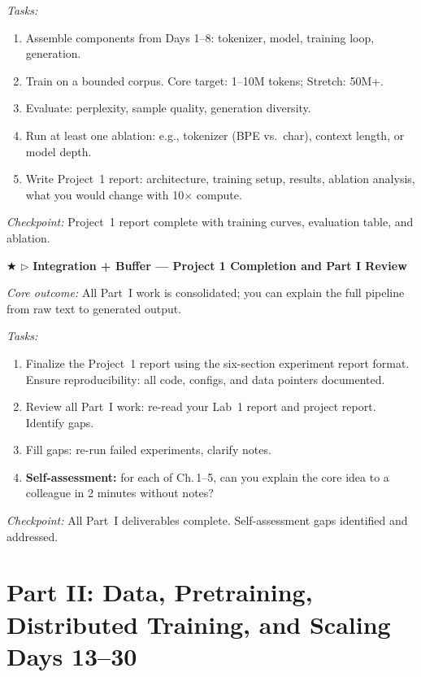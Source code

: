 \begin{description}[style=nextline, leftmargin=1.8cm, labelwidth=1.5cm]
\textit{Tasks:}
\begin{enumerate}
    \item Assemble components from Days 1--8: tokenizer, model, training loop, generation.
    \item Train on a bounded corpus. Core target: 1--10M tokens; Stretch: 50M+.
    \item Evaluate: perplexity, sample quality, generation diversity.
    \item Run at least one ablation: e.g., tokenizer (BPE vs.\ char), context length, or model depth.
    \item Write Project~1 report: architecture, training setup, results, ablation analysis, what you would change with 10$\times$ compute.
\end{enumerate}

\textit{Checkpoint:} Project~1 report complete with training curves, evaluation table, and ablation.

\item[Day 11--12] $\bigstar$ $\triangleright$ \textbf{Integration + Buffer --- Project 1 Completion and Part I Review}

\textit{Core outcome:} All Part~I work is consolidated; you can explain the full pipeline from raw text to generated output.

\textit{Tasks:}
\begin{enumerate}
    \item Finalize the Project~1 report using the six-section experiment report format. Ensure reproducibility: all code, configs, and data pointers documented.
    \item Review all Part~I work: re-read your Lab~1 report and project report. Identify gaps.
    \item Fill gaps: re-run failed experiments, clarify notes.
    \item \textbf{Self-assessment:} for each of Ch.\,1--5, can you explain the core idea to a colleague in 2 minutes without notes?
\end{enumerate}

\textit{Checkpoint:} All Part~I deliverables complete. Self-assessment gaps identified and addressed.

\end{description}

\section*{Part II: Data, Pretraining, Distributed Training, and Scaling \hfill Days 13--30}


